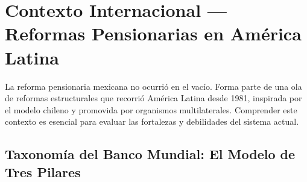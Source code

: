 \documentclass[11pt,a4paper]{report}
\begin{document}

\chapter{Contexto Internacional --- Reformas Pensionarias en Am\'erica Latina}

La reforma pensionaria mexicana no ocurri\'o en el vac\'io. Forma parte de una ola de reformas estructurales que recorri\'o Am\'erica Latina desde 1981, inspirada por el modelo chileno y promovida por organismos multilaterales. Comprender este contexto es esencial para evaluar las fortalezas y debilidades del sistema actual.

\section{Taxonom\'ia del Banco Mundial: El Modelo de Tres Pilares}
\end{document}

